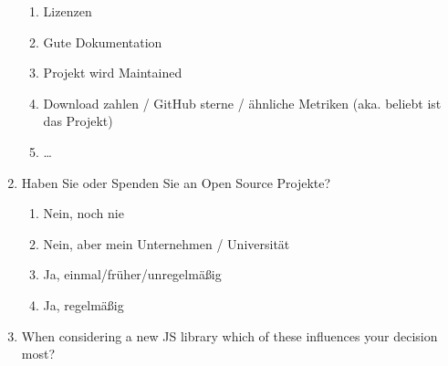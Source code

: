 \begin{enumerate}
          \begin{enumerate}
              \item Lizenzen
              \item Gute Dokumentation
              \item Projekt wird Maintained
              \item Download zahlen / GitHub sterne / ähnliche Metriken (aka. beliebt ist das Projekt)
              \item \dots
          \end{enumerate}
    \item Haben Sie oder Spenden Sie an Open Source Projekte?
          \begin{enumerate}
              \item Nein, noch nie
              \item Nein, aber mein Unternehmen / Universität
              \item Ja, einmal/früher/unregelmäßig
              \item Ja, regelmäßig
          \end{enumerate}
    \item When considering a new JS library which of these influences your decision most? 
\end{enumerate}